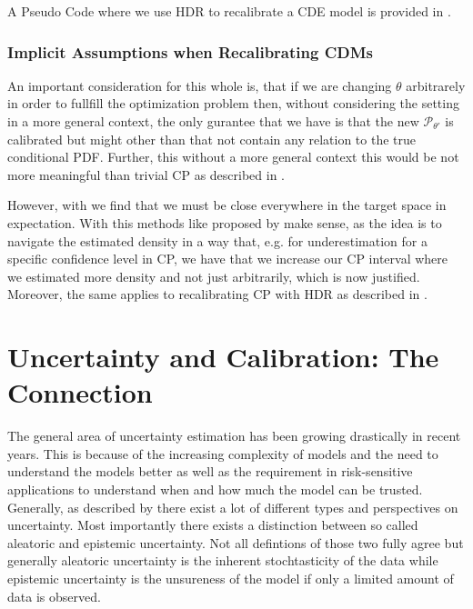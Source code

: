 A Pseudo Code where we use HDR to recalibrate a CDE model is provided in .

\subsubsection{Implicit Assumptions when Recalibrating CDMs}\label{sec:implicit_assumptions_cde}

An important consideration for this whole  is, that if we are changing $\theta$ arbitrarely in order to fullfill the optimization problem then, without considering the setting in a more general context, the only gurantee that we have is that the new $\mathscr{P}_{\theta'}$ is calibrated but might other than that not contain any relation to the true conditional PDF. Further, this without a more general context this would be not more meaningful than trivial CP as described in .

However, with  we find that we must be close everywhere in the target space in expectation. With this methods like proposed by \cite{sesia2021conformal} make sense, as the idea is to navigate the estimated density in a way that, e.g. for underestimation for a specific confidence level in CP, we have that we increase our CP interval where we estimated more density and not just arbitrarily, which is now justified. Moreover, the same applies to recalibrating CP with HDR as described in .

\section{Uncertainty and Calibration: The Connection}\label{sec:uncertainty_calibration}

The general area of uncertainty estimation has been growing drastically in recent years. This is because of the increasing complexity of models and the need to understand the models better as well as the requirement in risk-sensitive applications to understand when and how much the model can be trusted. Generally, as described by \cite{hullermeier_aleatoric_2021} there exist a lot of different types and perspectives on uncertainty. Most importantly there exists a distinction between so called aleatoric and epistemic uncertainty. Not all defintions of those two fully agree but generally aleatoric uncertainty is the inherent stochtasticity of the data while epistemic uncertainty is the unsureness of the model if only a limited amount of data is observed.

